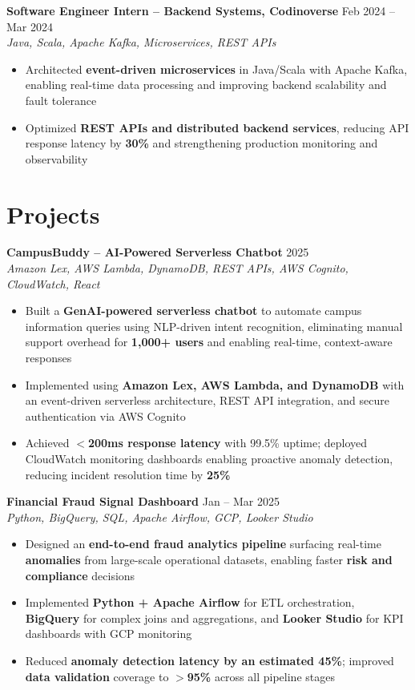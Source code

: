 \documentclass[10.5pt]{article}
\begin{document}
\vspace{-2pt}
\textbf{Software Engineer Intern -- Backend Systems, Codinoverse} \hfill Feb 2024 -- Mar 2024 \\
\textit{Java, Scala, Apache Kafka, Microservices, REST APIs}
\begin{itemize}
  \item Architected \textbf{event-driven microservices} in Java/Scala with Apache Kafka,
        enabling real-time data processing and improving backend scalability and fault tolerance
  \item Optimized \textbf{REST APIs and distributed backend services}, reducing API response
        latency by \textbf{30\%} and strengthening production monitoring and observability
\end{itemize}
\vspace{-6pt}

\section{Projects}

\textbf{CampusBuddy -- AI-Powered Serverless Chatbot} \hfill 2025 \\
\textit{Amazon Lex, AWS Lambda, DynamoDB, REST APIs, AWS Cognito, CloudWatch, React}
\begin{itemize}
  \item Built a \textbf{GenAI-powered serverless chatbot} to automate campus information
        queries using NLP-driven intent recognition, eliminating manual support overhead
        for \textbf{1,000+ users} and enabling real-time, context-aware responses
  \item Implemented using \textbf{Amazon Lex, AWS Lambda, and DynamoDB} with an event-driven
        serverless architecture, REST API integration, and secure authentication via AWS Cognito
  \item Achieved \textbf{$<$200ms response latency} with 99.5\% uptime; deployed CloudWatch
        monitoring dashboards enabling proactive anomaly detection, reducing incident
        resolution time by \textbf{25\%}
\end{itemize}

\vspace{-2pt}
\textbf{Financial Fraud Signal Dashboard} \hfill Jan -- Mar 2025 \\
\textit{Python, BigQuery, SQL, Apache Airflow, GCP, Looker Studio}
\begin{itemize}
  \item Designed an \textbf{end-to-end fraud analytics pipeline} surfacing real-time \textbf{anomalies}
        from large-scale operational datasets, enabling faster \textbf{risk and compliance} decisions
  \item Implemented \textbf{Python + Apache Airflow} for ETL orchestration, \textbf{BigQuery} for
        complex joins and aggregations, and \textbf{Looker Studio} for KPI dashboards with GCP monitoring
  \item Reduced \textbf{anomaly detection latency by an estimated 45\%}; improved \textbf{data validation}
        coverage to \textbf{$>$95\%} across all pipeline stages
\end{itemize}
\end{document}
